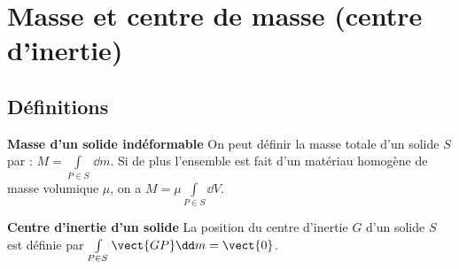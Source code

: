 \def\xxactivite{Cours}
\def\xxauteur{\textsl{Xavier Pessoles}}

\fichefalse
\proftrue
\tdfalse
\courstrue

\def\xxnumchapitre{Chapitre 1 \vspace{.2cm}}
\def\xxchapitre{\hspace{.12cm} Caractérisation inertielle des solides}

\def\xxcompetences{%
\textsl{%
\textbf{Savoirs et compétences :}\\
\begin{itemize}[label=\ding{112},font=\color{ocre}] 
\item \textit{Mod2.C13} : centre d'inertie;
\item \textit{Mod2.C14} : opérateur d'inertie;
\item \textit{Mod2.C15} : matrice d'inertie.
\end{itemize}
}}


\def\xxfigures{
\texttt{[image: fig\_01]}\\
\textit{Toupie}

\texttt{[image: fig\_02]}\\
\textit{Volants d'inertie d'un vilebrequin}
}%



\setlength{\columnseprule}{.1pt}

\vspace{2cm}
\pagestyle{fancy}
\thispagestyle{plain}


\section{Masse et centre de masse (centre d'inertie)}
\subsection{Définitions}
\begin{defi}\textbf{Masse d'un solide indéformable}
On peut définir la masse totale d'un solide $S$ par : $M=\int\limits_{P\in S} \,\dd m$. Si de plus l'ensemble est fait d'un matériau homogène de masse volumique $\mu$, on a $M=\mu \int\limits_{P\in S} \dd V$. \end{defi}


\begin{defi}\textbf{Centre d'inertie d'un solide}
La position du centre d'inertie $G$ d'un solide $S$ est définie par $\int\limits_{P\in S} \vect{GP} \dd m = \vect{0}$.
\end{defi}

